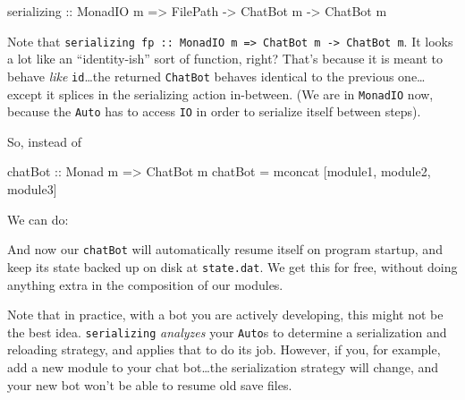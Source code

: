 \documentclass[]{article}
\newenvironment{Shaded}{}{}
\newcommand{\DataTypeTok}[1]{\textcolor[rgb]{0.56,0.13,0.00}{#1}}
\newcommand{\FunctionTok}[1]{\textcolor[rgb]{0.02,0.16,0.49}{#1}}
\newcommand{\NormalTok}[1]{#1}
\newcommand{\OperatorTok}[1]{\textcolor[rgb]{0.40,0.40,0.40}{#1}}
\newcommand{\OtherTok}[1]{\textcolor[rgb]{0.00,0.44,0.13}{#1}}
\newcommand{\StringTok}[1]{\textcolor[rgb]{0.25,0.44,0.63}{#1}}
\begin{document}
\begin{Shaded}
\begin{Highlighting}[]
\OtherTok{serializing\textquotesingle{} ::} \DataTypeTok{MonadIO}\NormalTok{ m }\OtherTok{=>} \DataTypeTok{FilePath} \OtherTok{{-}>} \DataTypeTok{ChatBot}\NormalTok{ m }\OtherTok{{-}>} \DataTypeTok{ChatBot}\NormalTok{ m}
\end{Highlighting}
\end{Shaded}

Note that
\texttt{serializing\textquotesingle{}\ fp\ ::\ MonadIO\ m\ =\textgreater{}\ ChatBot\ m\ -\textgreater{}\ ChatBot\ m}.
It looks a lot like an ``identity-ish'' sort of function, right? That's because
it is meant to behave \emph{like} \texttt{id}\ldots the returned
\texttt{ChatBot} behaves identical to the previous one\ldots except it splices
in the serializing action in-between. (We are in \texttt{MonadIO} now, because
the \texttt{Auto} has to access \texttt{IO} in order to serialize itself between
steps).

So, instead of

\begin{Shaded}
\begin{Highlighting}[]
\OtherTok{chatBot ::} \DataTypeTok{Monad}\NormalTok{ m }\OtherTok{=>} \DataTypeTok{ChatBot}\NormalTok{ m}
\NormalTok{chatBot }\OtherTok{=} \FunctionTok{mconcat}\NormalTok{ [module1, module2, module3]}
\end{Highlighting}
\end{Shaded}

We can do:

\begin{Shaded}
\end{Shaded}

And now our \texttt{chatBot} will automatically resume itself on program
startup, and keep its state backed up on disk at \texttt{state.dat}. We get this
for free, without doing anything extra in the composition of our modules.

Note that in practice, with a bot you are actively developing, this might not be
the best idea. \texttt{serializing\textquotesingle{}} \emph{analyzes} your
\texttt{Auto}s to determine a serialization and reloading strategy, and applies
that to do its job. However, if you, for example, add a new module to your chat
bot\ldots the serialization strategy will change, and your new bot won't be able
to resume old save files.
\end{document}
